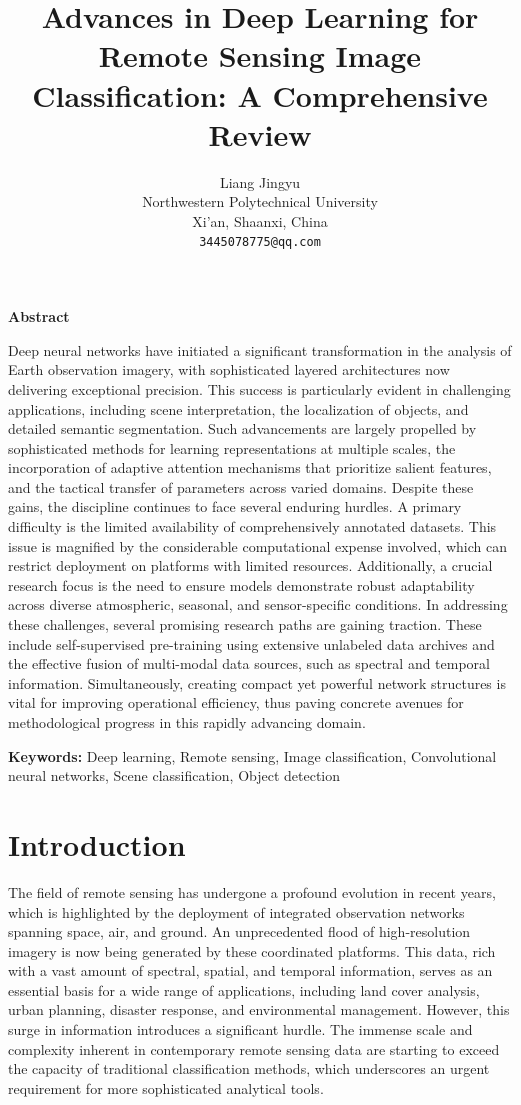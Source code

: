 \documentclass[12pt,a4paper]{article}
\title{\fontsize{14}{17}\selectfont\textbf{Advances in Deep Learning for Remote Sensing Image Classification: A Comprehensive Review}}
\author{Liang Jingyu\\
Northwestern Polytechnical University\\
Xi'an, Shaanxi, China\\
\texttt{3445078775@qq.com}}
\date{}
\begin{document}
\maketitle

\begin{center}
    \textbf{Abstract}
\end{center}
Deep neural networks have initiated a significant transformation in the analysis of Earth observation imagery, with sophisticated layered architectures now delivering exceptional precision. This success is particularly evident in challenging applications, including scene interpretation, the localization of objects, and detailed semantic segmentation. Such advancements are largely propelled by sophisticated methods for learning representations at multiple scales, the incorporation of adaptive attention mechanisms that prioritize salient features, and the tactical transfer of parameters across varied domains. Despite these gains, the discipline continues to face several enduring hurdles. A primary difficulty is the limited availability of comprehensively annotated datasets. This issue is magnified by the considerable computational expense involved, which can restrict deployment on platforms with limited resources. Additionally, a crucial research focus is the need to ensure models demonstrate robust adaptability across diverse atmospheric, seasonal, and sensor-specific conditions. In addressing these challenges, several promising research paths are gaining traction. These include self-supervised pre-training using extensive unlabeled data archives and the effective fusion of multi-modal data sources, such as spectral and temporal information. Simultaneously, creating compact yet powerful network structures is vital for improving operational efficiency, thus paving concrete avenues for methodological progress in this rapidly advancing domain.

\textbf{Keywords:} Deep learning, Remote sensing, Image classification, Convolutional neural networks, Scene classification, Object detection

\section{Introduction}
\label{sec:introduction}

The field of remote sensing has undergone a profound evolution in recent years, which is highlighted by the deployment of integrated observation networks spanning space, air, and ground. An unprecedented flood of high-resolution imagery is now being generated by these coordinated platforms. This data, rich with a vast amount of spectral, spatial, and temporal information, serves as an essential basis for a wide range of applications, including land cover analysis, urban planning, disaster response, and environmental management. However, this surge in information introduces a significant hurdle. The immense scale and complexity inherent in contemporary remote sensing data are starting to exceed the capacity of traditional classification methods, which underscores an urgent requirement for more sophisticated analytical tools.
\end{document}
